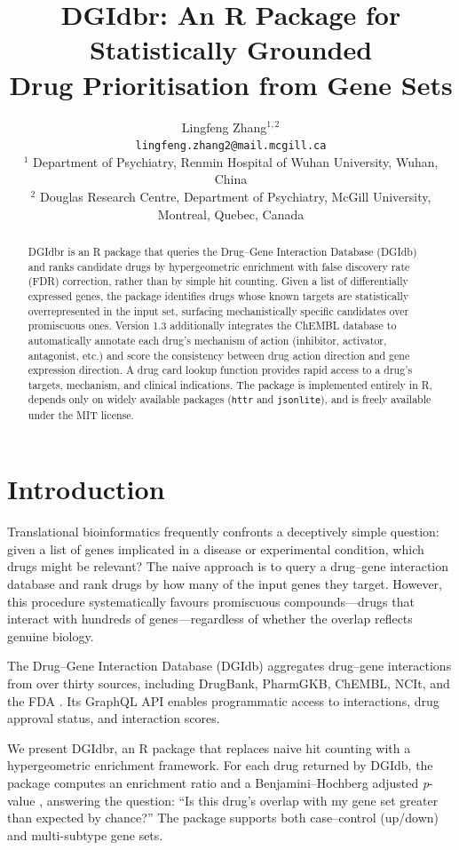 \documentclass[11pt,a4paper]{article}
\title{DGIdbr: An R Package for Statistically Grounded\\Drug Prioritisation from Gene Sets}
\author{Lingfeng Zhang$^{1,2}$\\
  \small \texttt{lingfeng.zhang2@mail.mcgill.ca}\\
  \small $^{1}$ Department of Psychiatry, Renmin Hospital of Wuhan University, Wuhan, China\\
  \small $^{2}$ Douglas Research Centre, Department of Psychiatry, McGill University, Montreal, Quebec, Canada
}
\date{}
\begin{document}
\maketitle

\begin{abstract}
DGIdbr is an R package that queries the Drug–Gene Interaction Database (DGIdb) and ranks candidate drugs by hypergeometric enrichment with false discovery rate (FDR) correction, rather than by simple hit counting. Given a list of differentially expressed genes, the package identifies drugs whose known targets are statistically overrepresented in the input set, surfacing mechanistically specific candidates over promiscuous ones. Version 1.3 additionally integrates the ChEMBL database to automatically annotate each drug's mechanism of action (inhibitor, activator, antagonist, etc.) and score the consistency between drug action direction and gene expression direction. A drug card lookup function provides rapid access to a drug's targets, mechanism, and clinical indications. The package is implemented entirely in R, depends only on widely available packages (\texttt{httr} and \texttt{jsonlite}), and is freely available under the MIT license.
\end{abstract}

\section{Introduction}

Translational bioinformatics frequently confronts a deceptively simple question: given a list of genes implicated in a disease or experimental condition, which drugs might be relevant? The naive approach is to query a drug--gene interaction database and rank drugs by how many of the input genes they target. However, this procedure systematically favours promiscuous compounds---drugs that interact with hundreds of genes---regardless of whether the overlap reflects genuine biology.

The Drug--Gene Interaction Database (DGIdb) aggregates drug--gene interactions from over thirty sources, including DrugBank, PharmGKB, ChEMBL, NCIt, and the FDA \citep{freshour2021,cannon2024}. Its GraphQL API enables programmatic access to interactions, drug approval status, and interaction scores.

We present DGIdbr, an R package that replaces naive hit counting with a hypergeometric enrichment framework. For each drug returned by DGIdb, the package computes an enrichment ratio and a Benjamini--Hochberg adjusted \emph{p}-value \citep{benjamini1995}, answering the question: ``Is this drug's overlap with my gene set greater than expected by chance?'' The package supports both case--control (up/down) and multi-subtype gene sets.
\end{document}
